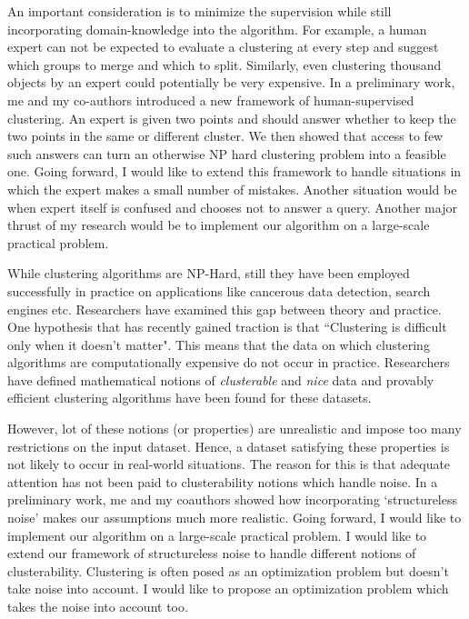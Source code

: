 \documentclass[12pt]{article}
\begin{document}
An important consideration is to minimize the supervision while still incorporating domain-knowledge into the algorithm. For example, a human expert can not be expected to evaluate a clustering at every step and suggest which groups to merge and which to split. Similarly, even clustering thousand objects by an expert could potentially be very expensive. In a preliminary work, me and my co-authors introduced a new framework of human-supervised clustering. An expert is given two points and should answer whether to keep the two points in the same or different cluster. We then showed that access to few such answers can turn an otherwise NP hard clustering problem into a feasible one. Going forward, I would like to extend this framework to handle situations in which the expert makes a small number of mistakes. Another situation would be when expert itself is confused and chooses not to answer a query. Another major thrust of my research would be to implement our algorithm on a large-scale practical problem. 

While clustering algorithms are NP-Hard, still they have been employed successfully in practice on applications like cancerous data detection, search engines etc. Researchers have examined this gap between theory and practice. One hypothesis that has recently gained traction is that ``Clustering is difficult only when it doesn't matter". This means that the data on which clustering algorithms are computationally expensive do not occur in practice. Researchers have defined mathematical notions of {\em clusterable} and {\em nice} data and provably efficient clustering algorithms have been found for these datasets.

However, lot of these notions (or properties) are unrealistic and impose too many restrictions on the input dataset. Hence, a dataset satisfying these properties is not likely to occur in real-world situations. The reason for this is that adequate attention has not been paid to clusterability notions which handle noise. In a preliminary work, me and my coauthors showed how incorporating `structureless noise' makes our assumptions much more realistic. Going forward, I would like to implement our algorithm on a large-scale practical problem. I would like to extend our framework of structureless noise to handle different notions of clusterability. Clustering is often posed as an optimization problem but doesn't take noise into account. I would like to propose an optimization problem which takes the noise into account too. 
\end{document}
